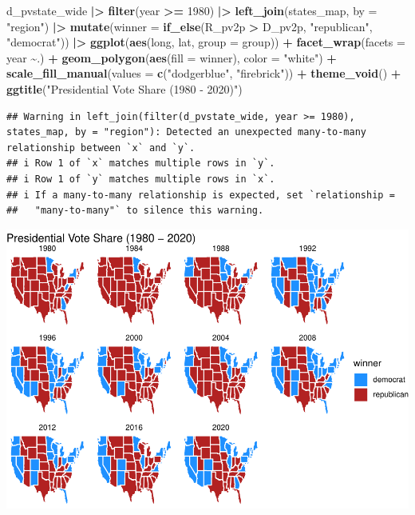 \documentclass[
]{article}
\newenvironment{Shaded}{\begin{snugshade}}{\end{snugshade}}
\newcommand{\AttributeTok}[1]{\textcolor[rgb]{0.13,0.29,0.53}{#1}}
\newcommand{\DecValTok}[1]{\textcolor[rgb]{0.00,0.00,0.81}{#1}}
\newcommand{\FunctionTok}[1]{\textcolor[rgb]{0.13,0.29,0.53}{\textbf{#1}}}
\newcommand{\NormalTok}[1]{#1}
\newcommand{\SpecialCharTok}[1]{\textcolor[rgb]{0.81,0.36,0.00}{\textbf{#1}}}
\newcommand{\StringTok}[1]{\textcolor[rgb]{0.31,0.60,0.02}{#1}}
\begin{document}
\begin{Shaded}
\begin{Highlighting}[]
\NormalTok{d\_pvstate\_wide }\SpecialCharTok{|\textgreater{}}
  \FunctionTok{filter}\NormalTok{(year }\SpecialCharTok{\textgreater{}=} \DecValTok{1980}\NormalTok{) }\SpecialCharTok{|\textgreater{}}
  \FunctionTok{left\_join}\NormalTok{(states\_map, }\AttributeTok{by =} \StringTok{"region"}\NormalTok{) }\SpecialCharTok{|\textgreater{}}
  \FunctionTok{mutate}\NormalTok{(}\AttributeTok{winner =} \FunctionTok{if\_else}\NormalTok{(R\_pv2p }\SpecialCharTok{\textgreater{}}\NormalTok{ D\_pv2p, }\StringTok{"republican"}\NormalTok{, }\StringTok{"democrat"}\NormalTok{)) }\SpecialCharTok{|\textgreater{}}
  \FunctionTok{ggplot}\NormalTok{(}\FunctionTok{aes}\NormalTok{(long, lat, }\AttributeTok{group =}\NormalTok{ group)) }\SpecialCharTok{+}
  \FunctionTok{facet\_wrap}\NormalTok{(}\AttributeTok{facets =}\NormalTok{ year }\SpecialCharTok{\textasciitilde{}}\NormalTok{.) }\SpecialCharTok{+}
  \FunctionTok{geom\_polygon}\NormalTok{(}\FunctionTok{aes}\NormalTok{(}\AttributeTok{fill =}\NormalTok{ winner), }\AttributeTok{color =} \StringTok{"white"}\NormalTok{) }\SpecialCharTok{+}
  \FunctionTok{scale\_fill\_manual}\NormalTok{(}\AttributeTok{values =} \FunctionTok{c}\NormalTok{(}\StringTok{"dodgerblue"}\NormalTok{, }\StringTok{"firebrick"}\NormalTok{)) }\SpecialCharTok{+}
  \FunctionTok{theme\_void}\NormalTok{() }\SpecialCharTok{+}
    \FunctionTok{ggtitle}\NormalTok{(}\StringTok{"Presidential Vote Share (1980 {-} 2020)"}\NormalTok{)}
\end{Highlighting}
\end{Shaded}

\begin{verbatim}
## Warning in left_join(filter(d_pvstate_wide, year >= 1980), states_map, by = "region"): Detected an unexpected many-to-many relationship between `x` and `y`.
## i Row 1 of `x` matches multiple rows in `y`.
## i Row 1 of `y` matches multiple rows in `x`.
## i If a many-to-many relationship is expected, set `relationship =
##   "many-to-many"` to silence this warning.
\end{verbatim}

\includegraphics{Lab1-notes_files/figure-latex/unnamed-chunk-2-2.pdf}
\end{document}
